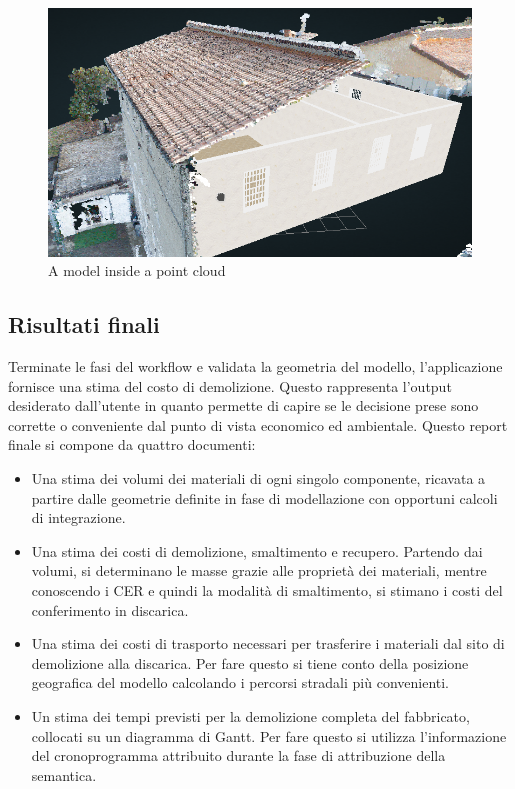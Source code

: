 \begin{figure}[htbp] %
   \centering
   \includegraphics[width=1\linewidth]{images/augmented}
   \caption{A model inside a point cloud}
   \label{fig:augmented}
\end{figure}

\subsection{Risultati finali}

\noindent Terminate le fasi del workflow e validata la geometria del modello, l'applicazione fornisce una stima del costo di demolizione. Questo rappresenta l'output desiderato dall'utente in quanto permette di capire se le decisione prese sono corrette o conveniente dal punto di vista economico ed ambientale. Questo report finale si compone da quattro documenti:
\begin{itemize}
 \item Una stima dei volumi dei materiali di ogni singolo componente, ricavata a partire dalle geometrie definite in fase di modellazione con opportuni calcoli di integrazione.
 \item Una stima dei costi di demolizione, smaltimento e recupero. Partendo dai volumi, si determinano le masse grazie alle propriet\`a dei materiali, mentre conoscendo i CER e quindi la modalit\`a di smaltimento, si stimano i costi del conferimento in discarica.
 \item Una stima dei costi di trasporto necessari per trasferire i materiali dal sito di demolizione alla discarica. Per fare questo si tiene conto della posizione geografica del modello calcolando i percorsi stradali pi\`u convenienti.
 \item Un stima dei tempi previsti per la demolizione completa del fabbricato, collocati su un diagramma di Gantt. Per fare questo si utilizza l'informazione del cronoprogramma attribuito durante la fase di attribuzione della semantica.

\end{itemize}


\noindent